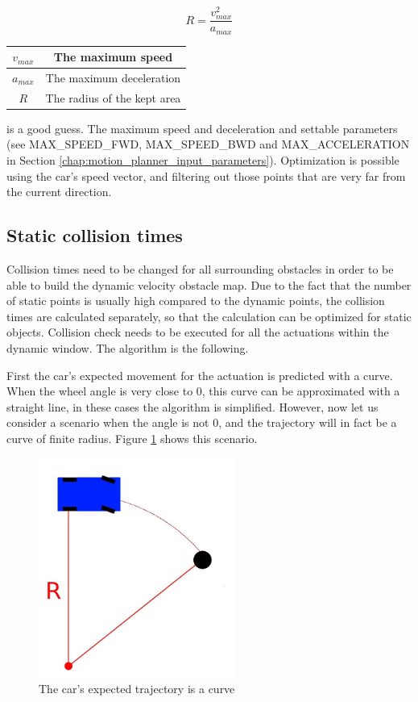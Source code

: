 \begin{equation}\label{eq:static_area}
R = \frac{v_{max}^2}{a_{max}}
\end{equation}

\begin{center}
    \begin{tabular}{ | c | c | }
        \hline
        $v_{max}$    & The maximum speed             \\
        \hline
        $a_{max}$    & The maximum deceleration      \\
        \hline
        $R$          & The radius of the kept area   \\
        \hline
    \end{tabular}
\end{center}

is a good guess. The maximum speed and deceleration and settable parameters (see MAX\_SPEED\_FWD, MAX\_SPEED\_BWD and MAX\_ACCELERATION in Section \ref{chap:motion_planner_input_parameters}). Optimization is possible using the car's speed vector, and filtering out those points that are very far from the current direction.

\subsection{Static collision times}
Collision times need to be changed for all surrounding obstacles in order to be able to build the dynamic velocity obstacle map. Due to the fact that the number of static points is usually high compared to the dynamic points, the collision times are calculated separately, so that the calculation can be optimized for static objects. Collision check needs to be executed for all the actuations within the dynamic window. The algorithm is the following.

First the car's expected movement for the actuation is predicted with a curve. When the wheel angle is very close to 0, this curve can be approximated with a straight line, in these cases the algorithm is simplified. However, now let us consider a scenario when the angle is not 0, and the trajectory will in fact be a curve of finite radius. Figure \ref{static_collision_time_check_objects} shows this scenario.

\begin{figure}[!ht]
    \centering
    \includegraphics[height=72mm]{figures/raw/jpeg/static_collision_time_check_objects.jpg}
    \caption{The car's expected trajectory is a curve}
    \label{static_collision_time_check_objects}
\end{figure}

